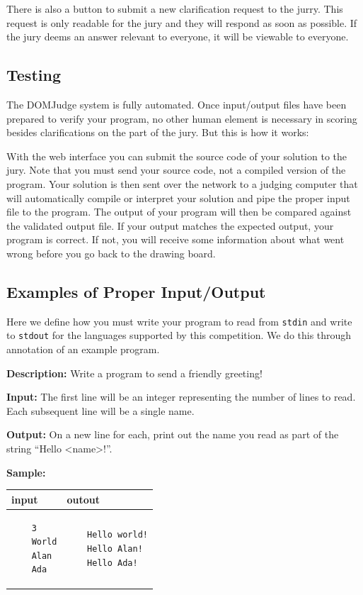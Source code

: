 \documentclass[a4paper]{article}
\begin{document}
There is also a button to submit a new clarification request to the jurry. This request is only readable for the jury and they will respond as soon as possible. If the jury deems an answer relevant to everyone, it will be viewable to everyone. 

\subsection{Testing}
The DOMJudge system is fully automated. Once input/output files have been prepared to verify your program, no other human element is necessary in scoring besides clarifications on the part of the jury. But this is how it works:

With the web interface you can submit the source code of your solution to the jury. Note that you must send your source code, not a compiled version of the program. Your solution is then sent over the network to a judging computer that will automatically compile or interpret your solution and pipe the proper input file to the program. The output of your program will then be compared against the validated output file. If your output matches the expected output, your program is correct. If not, you will receive some information about what went wrong before you go back to the drawing board. 

\subsection{Examples of Proper Input/Output}
Here we define how you must write your program to read from \texttt{stdin} and write to \texttt{stdout} for the languages supported by this competition. We do this through annotation of an example program.

\textbf{Description:} Write a program to send a friendly greeting! 

\textbf{Input:} The first line will be an integer representing the number of lines to read. Each subsequent line will be a single name.

\textbf{Output:} On a new line for each, print out the name you read as part of the string ``Hello \textless name\textgreater!''.

\textbf{Sample:}

\begin{tabular}{|p{}|p{}|}
    \hline
    \textbf{input} & \textbf{outout} \\
    \hline
    \begin{verbatim}
    3
    World
    Alan
    Ada
    \end{verbatim} &
    \begin{verbatim}
    Hello world!
    Hello Alan!
    Hello Ada!
    \end{verbatim} \\
    \hline
\end{tabular}
\newpage
\end{document}
